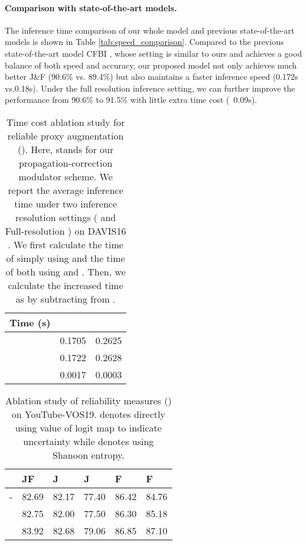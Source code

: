 \documentclass[letterpaper]{article} \usepackage{aaai22}  \usepackage{times}  \usepackage{helvet}  \usepackage{courier}  \usepackage[hyphens]{url}  \usepackage{graphicx} \urlstyle{rm} \def\UrlFont{\rm}  \usepackage{natbib}  \usepackage{caption} \DeclareCaptionStyle{ruled}{labelfont=normalfont,labelsep=colon,strut=off} \frenchspacing  \setlength{\pdfpagewidth}{8.5in}  \setlength{\pdfpageheight}{11in}  \usepackage{algorithm}
\begin{document}
\paragraph{Comparison with state-of-the-art models.}
The inference time comparison of our whole model and previous state-of-the-art models is shown in Table \ref{tab:speed_comparison}. Compared to the previous state-of-the-art model CFBI \cite{yang2020collaborative}, whose setting is similar to ours and achieves a good balance of both speed and accuracy, our proposed model not only achieves much better J\&F (90.6\% vs. 89.4\%) but also maintains a faster inference speed (0.172s vs.0.18s). Under the full resolution inference setting, we can further improve the performance from 90.6\% to 91.5\% with little extra time cost (~0.09s). 
\begin{table}[t!]
    \centering
	\caption{Time cost ablation study for reliable proxy augmentation (). Here,  stands for our propagation-correction modulator scheme. We report the average inference time under two inference resolution settings ( and Full-resolution ) on DAVIS16 \cite{perazzi2016benchmark}. We first calculate the time  of simply using  and the time  of both using  and . Then, we calculate the increased time  as  by subtracting  from .}
	\setlength{\tabcolsep}{6mm}
		\resizebox{0.35\textwidth}{!}
	{
    \begin{tabular}{@{}l|ll@{}}
    \toprule
     Time (s)                            &    &  \\ \midrule
                              & 0.1705 & 0.2625          \\
                          & 0.1722 & 0.2628          \\\midrule
                         & 0.0017    & 0.0003        \\
      \bottomrule
    \end{tabular}
    }\label{tab:RPA_time}
\end{table} \begin{table}[h]
\caption{Ablation study of reliability measures () on YouTube-VOS19.  denotes directly using value of logit map to indicate uncertainty while  denotes using Shanoon entropy. }

    \centering

    \setlength{\tabcolsep}{3mm}
    \resizebox{0.48\textwidth}{!}
    {
    \begin{tabular}{l|lllll}
    \toprule
       & JF  & J & J & F & F  \\ \midrule
    - & 82.69 & 82.17 & 77.40 & 86.42 & 84.76 \\
      & 82.75 & 82.00 &77.50 &86.30 & 85.18  \\
       &83.92 & 82.68 & 79.06 & 86.85 & 87.10 \\\bottomrule
    \end{tabular}\label{tab:uncertainty_measure}
     }
     

\end{table}
\end{document}
